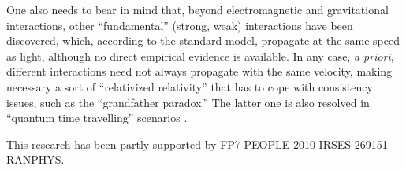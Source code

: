 \documentclass[%
  twocolumn,
 showpacs,
 showkeys,
 preprintnumbers,
 amsmath,amssymb,
 aps,
 prl,
  longbibliography,
 ]{revtex4-1}
\theoremstyle{definition}
\theoremstyle{remark}
\begin{document}
One also needs to bear in mind that, beyond electromagnetic and gravitational interactions,
other ``fundamental'' (strong, weak) interactions have been discovered, which, according to the standard model,
propagate at the same speed as light, although no direct empirical evidence is available.
In any case, {\it a priori}, different interactions need not always propagate with the same velocity,
making necessary a sort of ``relativized relativity'' \cite{svozil-relrel} that has to cope with
consistency issues, such as the ``grandfather paradox.''
The latter one is also resolved in ``quantum time travelling'' scenarios \cite{svozil-greenberger-2005}.




\begin{acknowledgments}
This research has been partly supported by FP7-PEOPLE-2010-IRSES-269151-RANPHYS.
\end{acknowledgments}

 
\end{document}
